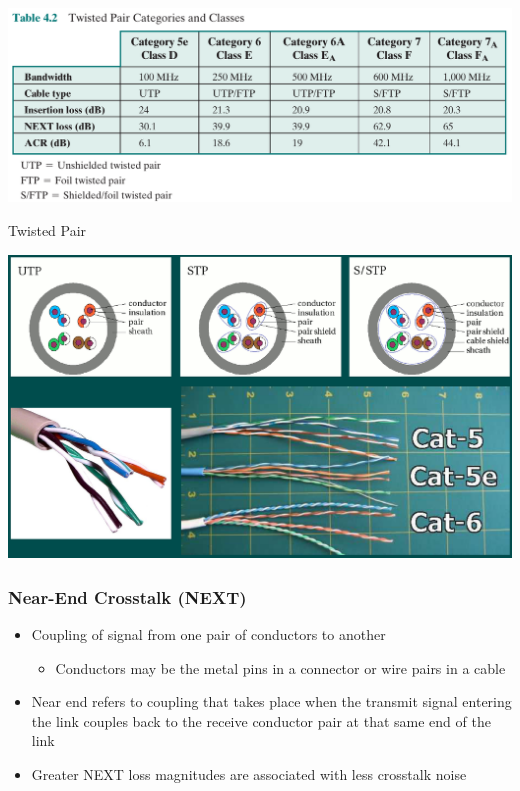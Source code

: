 \documentclass[pdflatex,compress]{beamer}
\begin{document}
\begin{frame}
	\begin{center}
		\includegraphics[width=\linewidth]{img/img07}
	\end{center}
\end{frame}

\begin{frame}{Twisted Pair}
	\begin{center}
		\includegraphics[width=\linewidth]{img/img08}
	\end{center}
\end{frame}

\begin{frame}
	\frametitle{Near-End Crosstalk (NEXT)}
	\begin{itemize}
		\item Coupling of signal from one pair of
		conductors to another
		\begin{itemize}
			\item Conductors may be the metal pins in a connector or wire pairs in a cable
		\end{itemize}
		\item Near end refers to coupling that takes place when the transmit signal entering the link couples back to the receive conductor pair at that same end of the link
		\item Greater NEXT loss magnitudes are associated with less crosstalk noise
	\end{itemize}
\end{frame}
\end{document}
